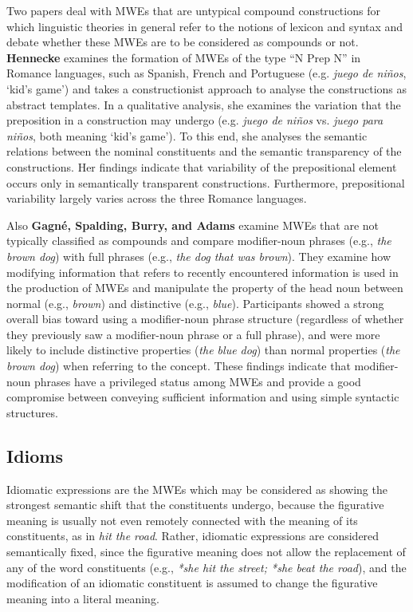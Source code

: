 \documentclass[output=paper]{langsci/langscibook}
\begin{document}
Two papers deal with MWEs that are untypical compound constructions
for which linguistic theories in general refer to the notions of
lexicon and syntax and debate whether these MWEs are to be considered
as compounds or not. \textbf{Hennecke} examines the formation of MWEs
of the type ``N Prep N'' in Romance languages, such as Spanish, French
and Portuguese (e.g. \textit{juego de niños}, `kid’s game') and takes
a constructionist approach to analyse the constructions as abstract
templates. In a qualitative analysis, she examines the variation that
the preposition in a construction may undergo (e.g. \textit{juego de
  niños} vs. \textit{juego para niños}, both meaning `kid’s game'). To
this end, she analyses the semantic relations between the nominal
constituents and the semantic transparency of the constructions. Her
findings indicate that variability of the prepositional element occurs
only in semantically transparent constructions. Furthermore,
prepositional variability largely varies across the three Romance
languages.

Also \textbf{Gagné, Spalding, Burry, and Adams} examine MWEs that are
not typically classified as compounds and compare modifier-noun
phrases (e.g., \textit{the brown dog}) with full phrases (e.g.,
\textit{the dog that was brown}). They examine how modifying
information that refers to recently encountered information is used in
the production of MWEs and manipulate the property of the head noun
between normal (e.g., \textit{brown}) and distinctive (e.g.,
\textit{blue}). Participants showed a strong overall bias toward using
a modifier-noun phrase structure (regardless of whether they
previously saw a modifier-noun phrase or a full phrase), and were more
likely to include distinctive properties (\textit{the blue dog}) than
normal properties (\textit{the brown dog}) when referring to the
concept. These findings indicate that modifier-noun phrases have a
privileged status among MWEs and provide a good compromise between
conveying sufficient information and using simple syntactic
structures.


\subsection{Idioms}
\label{sec:idioms}

Idiomatic expressions are the MWEs which may be considered as showing
the strongest semantic shift that the constituents undergo, because
the figurative meaning is usually not even remotely connected with the
meaning of its constituents, as in \textit{hit the road}. Rather,
idiomatic expressions are considered semantically fixed, since the
figurative meaning does not allow the replacement of any of the word
constituents (e.g., \textit{*she hit the street; *she beat the road}),
and the modification of an idiomatic constituent is assumed to change
the figurative meaning into a literal meaning.
\end{document}
